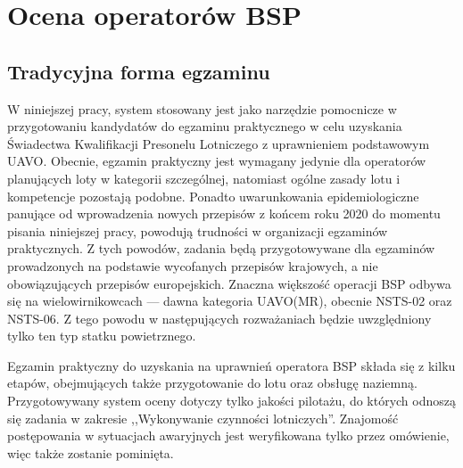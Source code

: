 \newpage
\section{Ocena operatorów BSP}

\subsection{Tradycyjna forma egzaminu}
\label{sec:tradycyjny-egzamin}
W niniejszej pracy, system stosowany jest jako narzędzie pomocnicze w przygotowaniu kandydatów do egzaminu praktycznego w celu uzyskania Świadectwa Kwalifikacji Presonelu Lotniczego z uprawnieniem podstawowym UAVO. Obecnie, egzamin praktyczny jest wymagany jedynie dla operatorów planujących loty w kategorii szczególnej\cite{ulc2019}, natomiast ogólne zasady lotu i kompetencje pozostają podobne. Ponadto uwarunkowania epidemiologiczne panujące od wprowadzenia nowych przepisów z końcem roku 2020 do momentu pisania niniejszej pracy, powodują trudności w organizacji egzaminów praktycznych. Z tych powodów, zadania będą przygotowywane dla egzaminów prowadzonych na podstawie wycofanych przepisów krajowych, a nie obowiązujących przepisów europejskich. Znaczna większość operacji BSP odbywa się na wielowirnikowcach --- dawna kategoria UAVO(MR), obecnie NSTS-02 oraz NSTS-06. Z tego powodu w następujących rozważaniach będzie uwzględniony tylko ten typ statku powietrznego.

Egzamin praktyczny do uzyskania na uprawnień operatora BSP składa się z kilku etapów, obejmujących także przygotowanie do lotu oraz obsługę naziemną\cite{ulc2014}. Przygotowywany system oceny dotyczy tylko jakości pilotażu, do których odnoszą się zadania w zakresie ,,Wykonywanie czynności lotniczych''. Znajomość postępowania w sytuacjach awaryjnych jest weryfikowana tylko przez omówienie, więc także zostanie pominięta.

